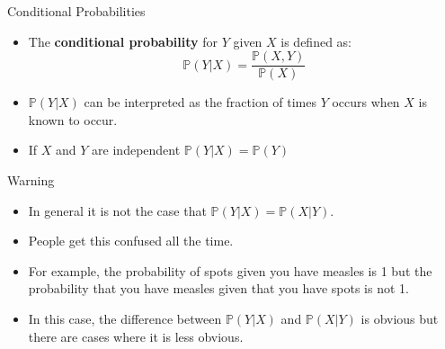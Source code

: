 \documentclass[handout]{beamer}
\begin{document}
\begin{frame}{Conditional Probabilities}
\scriptsize{
\begin{itemize}
\item The \textbf{conditional probability} for $Y$ given $X$ is defined as:
 \begin{displaymath}
  \mathbb{P}(Y|X) = \frac{\mathbb{P}(X,Y)}{\mathbb{P}(X)}
 \end{displaymath}
 \item $\mathbb{P}(Y|X)$ can be interpreted as the fraction of times $Y$ occurs when $X$ is known to occur.
  \item  If $X$ and $Y$ are independent $\mathbb{P}(Y|X)=\mathbb{P}(Y)$
\end{itemize}

\begin{block}{Warning}
\begin{itemize}
 \item In general it is not the case that $\mathbb{P}(Y|X) = \mathbb{P}(X|Y)$. 
\item People get this confused all the time. 
\item For example, the probability of spots given you have measles is 1 but the probability that you have measles given that you have spots is not 1. 
\item In this case, the difference between $\mathbb{P}(Y|X)$ and $\mathbb{P}(X|Y)$ is obvious but there are cases where it is less obvious.
\end{itemize}
 
\end{block}



} 
\end{frame}
\end{document}
